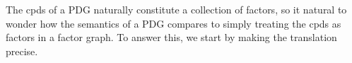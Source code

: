 \documentclass[letterpaper]{article} %
\theoremstyle{plain}
\theoremstyle{definition}
\theoremstyle{remark}
\begin{document}
The cpds of a PDG naturally constitute a collection of factors,
so it natural to wonder how the semantics of a PDG compares to 
simply treating the cpds as factors in a factor graph. To answer this,
we start by making the translation precise.
\end{document}
